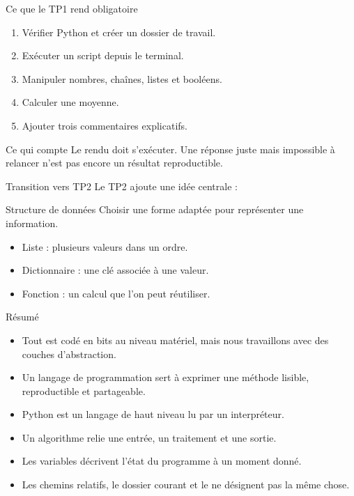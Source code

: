 \documentclass[10pt,aspectratio=169]{beamer}
\begin{document}
\begin{frame}{Ce que le TP1 rend obligatoire}
\begin{enumerate}
  \item Vérifier Python et créer un dossier de travail.
  \item Exécuter un script depuis le terminal.
  \item Manipuler nombres, chaînes, listes et booléens.
  \item Calculer une moyenne.
  \item Ajouter trois commentaires explicatifs.
\end{enumerate}
\begin{block}{Ce qui compte}
Le rendu doit s'exécuter. Une réponse juste mais impossible à relancer n'est pas encore un résultat reproductible.
\end{block}
\end{frame}

\begin{frame}{Transition vers TP2}
Le TP2 ajoute une idée centrale :
\begin{block}{Structure de données}
Choisir une forme adaptée pour représenter une information.
\end{block}
\begin{itemize}
  \item Liste : plusieurs valeurs dans un ordre.
  \item Dictionnaire : une clé associée à une valeur.
  \item Fonction : un calcul que l'on peut réutiliser.
\end{itemize}
\end{frame}

\begin{frame}{Résumé}
\begin{itemize}
  \item Tout est codé en bits au niveau matériel, mais nous travaillons avec des couches d’abstraction.
  \item Un langage de programmation sert à exprimer une méthode lisible, reproductible et partageable.
  \item Python est un langage de haut niveau lu par un interpréteur.
  \item Un algorithme relie une entrée, un traitement et une sortie.
  \item Les variables décrivent l’état du programme à un moment donné.
  \item Les chemins relatifs, le dossier courant et le  ne désignent pas la même chose.
\end{itemize}
\end{frame}
\end{document}
